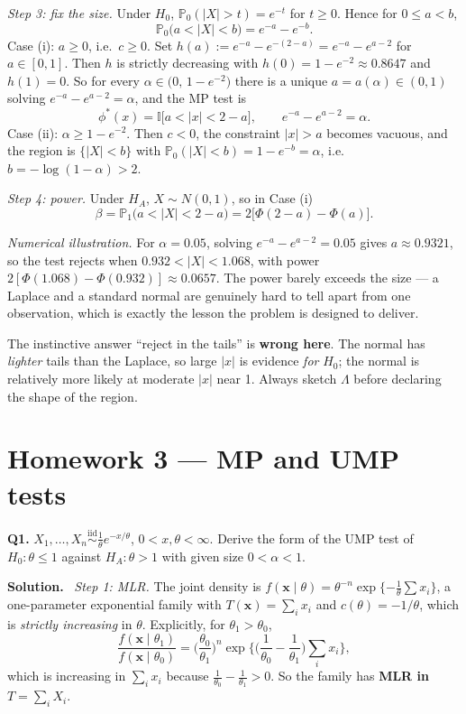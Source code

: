 \documentclass[11pt]{article}
\newcommand{\Prob}{\mathbb{P}}
\newcommand{\iid}{\overset{\text{iid}}{\sim}}
\newenvironment{prob}[1]{\medskip\noindent\textbf{\large #1}\quad}{\par}
\newcommand{\soln}{\medskip\noindent\textbf{Solution.}\ }
\begin{document}
\emph{Step 3: fix the size.} Under $H_0$, $\Prob_0(|X|>t)=e^{-t}$ for $t\ge0$. Hence for
$0\le a<b$,
\[
\Prob_0\big(a<|X|<b\big)=e^{-a}-e^{-b}.
\]
Case (i): $a\ge0$, i.e.\ $c\ge0$. Set $h(a):=e^{-a}-e^{-(2-a)}=e^{-a}-e^{a-2}$ for
$a\in[0,1]$. Then $h$ is strictly decreasing with $h(0)=1-e^{-2}\approx0.8647$ and $h(1)=0$.
So for every $\alpha\in\big(0,\,1-e^{-2}\big)$ there is a unique $a=a(\alpha)\in(0,1)$ solving
$e^{-a}-e^{a-2}=\alpha$, and the MP test is
\[
\boxed{\ \phi^*(x)=\mathbb{I}\big[a<|x|<2-a\big],\qquad e^{-a}-e^{a-2}=\alpha.\ }
\]
Case (ii): $\alpha\ge1-e^{-2}$. Then $c<0$, the constraint $|x|>a$ becomes vacuous, and the
region is $\{|X|<b\}$ with $\Prob_0(|X|<b)=1-e^{-b}=\alpha$, i.e.\ $b=-\log(1-\alpha)>2$.

\emph{Step 4: power.} Under $H_A$, $X\sim N(0,1)$, so in Case (i)
\[
\beta=\Prob_1\big(a<|X|<2-a\big)=2\big[\Phi(2-a)-\Phi(a)\big].
\]

\emph{Numerical illustration.} For $\alpha=0.05$, solving $e^{-a}-e^{a-2}=0.05$ gives
$a\approx0.9321$, so the test rejects when $0.932<|X|<1.068$, with power
$2[\Phi(1.068)-\Phi(0.932)]\approx0.0657$. The power barely exceeds the size --- a Laplace and
a standard normal are genuinely hard to tell apart from one observation, which is exactly the
lesson the problem is designed to deliver.

\begin{notebox}
The instinctive answer ``reject in the tails'' is \textbf{wrong here}. The normal has
\emph{lighter} tails than the Laplace, so large $|x|$ is evidence \emph{for} $H_0$; the normal
is relatively more likely at moderate $|x|$ near 1. Always sketch $\Lambda$ before declaring
the shape of the region.
\end{notebox}

\newpage
\section{Homework 3 --- MP and UMP tests}

\begin{prob}{Q1.}
$X_1,\dots,X_n\iid \tfrac1\theta e^{-x/\theta}$, $0<x,\theta<\infty$. Derive the form of the
UMP test of $H_0:\theta\le1$ against $H_A:\theta>1$ with given size $0<\alpha<1$.
\end{prob}

\soln
\emph{Step 1: MLR.} The joint density is
$f(\mathbf{x}\mid\theta)=\theta^{-n}\exp\{-\tfrac1\theta\sum x_i\}$, a one-parameter
exponential family with $T(\mathbf{x})=\sum_i x_i$ and $c(\theta)=-1/\theta$, which is
\emph{strictly increasing} in $\theta$. Explicitly, for $\theta_1>\theta_0$,
\[
\frac{f(\mathbf{x}\mid\theta_1)}{f(\mathbf{x}\mid\theta_0)}
=\Big(\frac{\theta_0}{\theta_1}\Big)^{n}
\exp\Big\{\Big(\frac{1}{\theta_0}-\frac{1}{\theta_1}\Big)\sum_i x_i\Big\},
\]
which is increasing in $\sum_i x_i$ because $\tfrac{1}{\theta_0}-\tfrac{1}{\theta_1}>0$.
So the family has \textbf{MLR in $T=\sum_iX_i$}.
\end{document}

